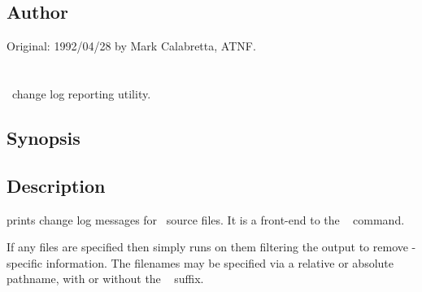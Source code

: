 \subsection*{Author}

Original: 1992/04/28 by Mark Calabretta, ATNF.


\newpage
\section{}
\label{alog}

\aipspp\ change log reporting utility.

\subsection*{Synopsis}

\begin{synopsis}
\end{synopsis}

\subsection*{Description}
 prints change log messages for \aipspp\ source files.  It is a
front-end to the \rcs\  command.

If any files are specified then  simply runs  on them
filtering the output to remove \rcs-specific information.  The filenames
may be specified via a relative or absolute pathname, with or without the
\rcs\  suffix.

